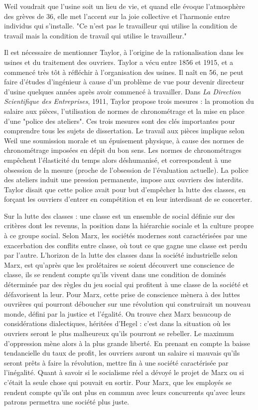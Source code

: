 \documentclass[a4paper,12pt]{book}
\begin{document}
\par Weil voudrait que l'usine soit un lieu de vie, et quand elle évoque l'atmosphère des grèves de 36, elle met l'accent sur la joie collective et l'harmonie entre individus qui s'installe. "Ce n'est pas le travailleur qui utilise la condition de travail mais la condition de travail qui utilise le travailleur."
\par Il est nécessaire de mentionner Taylor, à l'origine de la rationalisation dans les usines et du traitement des ouvriers. Taylor a vécu entre 1856 et 1915, et a commencé très tôt à réfléchir à l'organisation des usines. Il naît en 56, ne peut faire d'études d'ingénieur à cause d'un problème de vue pour devenir directeur d'usine quelques années après avoir commencé à travailler. Dans \textit{La Direction Scientifique des Entreprises}, 1911, Taylor propose trois mesures : la promotion du salaire aux pièces, l'utilisation de normes de chronométrage et la mise en place d'une "police des ateliers". Ces trois mesures sont des clés importantes pour comprendre tous les sujets de dissertation. Le travail aux pièces implique selon Weil une soumission morale et un épuisement physique, à cause des normes de chronométrage imposées en dépit du bon sens. Les normes de chronométrages empêchent l'élasticité du temps alors déshumanisé, et correspondent à une obsession de la mesure (proche de l'obsession de l'évaluation actuelle). La police des ateliers induit une pression permanente, impose aux ouvriers des interdits. Taylor disait que cette police avait pour but d'empêcher la lutte des classes, en forçant les ouvriers d'entrer en compétition et en leur interdisant de se concerter.
\par Sur la lutte des classes : une classe est un ensemble de social définie sur des critères dont les revenus, la position dans la hiérarchie sociale et la culture propre à ce groupe social. Selon Marx, les sociétés modernes sont caractérisées par une exacerbation des conflits entre classe, où tout ce que gagne une classe est perdu par l'autre. L'horizon de la lutte des classes dans la société industrielle selon Marx, est qu'après que les prolétaires se soient découvert une conscience de classe, ils se rendent compte qu'ils vivent dans une condition de dominés déterminée par des règles du jeu social qui profitent à une classe de la société et défavorisent la leur. Pour Marx, cette prise de conscience mènera à des luttes ouvrières qui pourront déboucher sur une révolution qui construirait un nouveau monde, défini par la justice et l'égalité. On trouve chez Marx beaucoup de considérations dialectiques, héritées d'Hegel : c'est dans la situation où les ouvriers seront le plus malheureux qu'ils pourront se rebeller. Le maximum d'oppression mène alors à la plus grande liberté. En prenant en compte la baisse tendancielle du taux de profit, les ouvriers auront un salaire si mauvais qu'ils seront prêts à faire la révolution, mettre fin à une société caractérisée par l'inégalité. Quant à savoir si le socialisme réel a dévoyé le projet de Marx ou si c'était la seule chose qui pouvait en sortir. Pour Marx, que les employés se rendent compte qu'ils ont plus en commun avec leurs concurrents qu'avec leurs patrons permettra une société plus juste.
\end{document}
